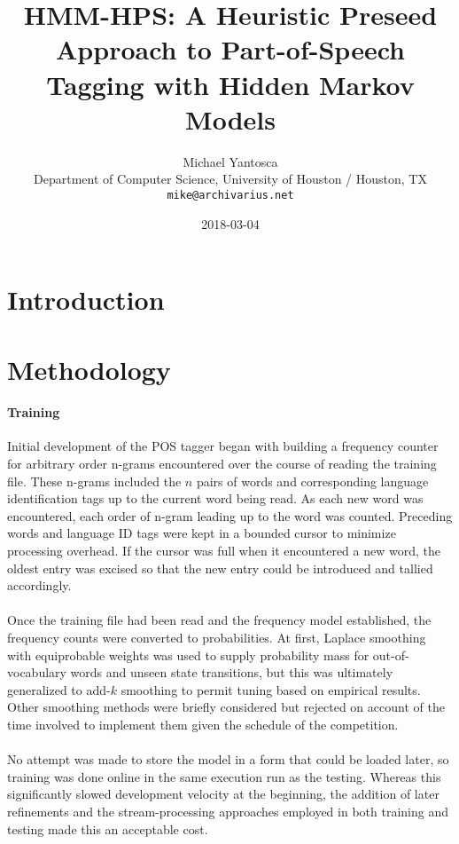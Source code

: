 \documentclass[11pt,a4paper]{article}
\title{HMM-HPS: A Heuristic Preseed Approach to Part-of-Speech Tagging with Hidden Markov Models}
\author{Michael Yantosca \\
  Department of Computer Science, University of Houston / Houston, TX \\
  {\tt mike@archivarius.net} \\}
\date{2018-03-04}
\begin{document}
\maketitle
\begin{abstract}
\end{abstract}

\section{Introduction}

\section{Methodology}

\paragraph{Training}
Initial development of the POS tagger began with building a frequency counter for
arbitrary order n-grams encountered over the course of reading the training file.
These n-grams included the $n$ pairs of words and corresponding language identification
tags up to the current word being read. As each new word was encountered, each
order of n-gram leading up to the word was counted. Preceding words and language ID
tags were kept in a bounded cursor to minimize processing overhead. If the cursor
was full when it encountered a new word, the oldest entry was excised so that the
new entry could be introduced and tallied accordingly.
\paragraph{}
Once the training file had been read and the frequency model established,
the frequency counts were converted to probabilities. At first, Laplace smoothing
\cite[47]{JurafskyMartin}
with equiprobable weights was used to supply probability mass for out-of-vocabulary
words and unseen state transitions, but this was ultimately generalized to add-$k$
smoothing \cite[49]{JurafskyMartin} to permit tuning based on empirical results.
Other smoothing methods were briefly considered but rejected on account of the time
involved to implement them given the schedule of the competition.

\paragraph{}
No attempt was made to store the model in a form that could be loaded later,
so training was done online in the same execution run as the testing.
Whereas this significantly slowed development velocity at the beginning,
the addition of later refinements and the stream-processing approaches
employed in both training and testing made this an acceptable cost.
\end{document}
